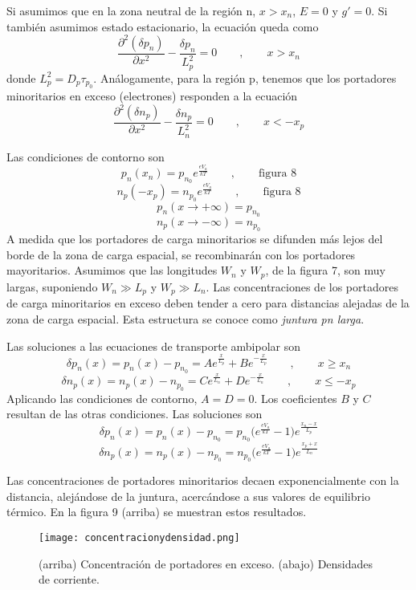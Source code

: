 \documentclass[12pt,a4paper]{article}
\begin{document}
Si asumimos que en la zona neutral de la región n, $x>x_{n}$, $E=0$ y $g'=0$. Si también asumimos estado estacionario, la ecuación queda como
\[ \frac{\partial^{2} (\delta p_{n})}{\partial x^{2}} - \frac{\delta p_{n}}{L_{p}^{2}} = 0 \qquad , \qquad x>x_{n} \]
donde $L_{p}^{2}=D_{p}\tau _{p_{0}}$. Análogamente, para la región p, tenemos que los portadores minoritarios en exceso (electrones) responden a la ecuación
\[ \frac{\partial^{2} (\delta n_{p})}{\partial x^{2}} - \frac{\delta n_{p}}{L_{n}^{2}} = 0 \qquad , \qquad x<-x_{p} \]

Las condiciones de contorno son
\[ p_{n}(x_{n})=p_{n_{0}} e^{\frac{eV_{a}}{kT}} \qquad , \qquad \textrm{figura 8} \]
\[ n_{p}(-x_{p})=n_{p_{0}} e^{\frac{eV_{a}}{kT}} \qquad , \qquad \textrm{figura 8} \]
\[ p_{n}(x \rightarrow +\infty)=p_{n_{0}} \]
\[ n_{p}(x \rightarrow -\infty)=n_{p_{0}} \]
A medida que los portadores de carga minoritarios se difunden más lejos del borde de la zona de carga espacial, se recombinarán con los portadores mayoritarios. Asumimos que las longitudes $W_{n}$ y $W_{p}$, de la figura 7, son muy largas, suponiendo $W_{n} \gg L_{p}$ y $W_{p} \gg L_{n}$. Las concentraciones de los portadores de carga minoritarios en exceso deben tender a cero para distancias alejadas de la zona de carga espacial. Esta estructura se conoce como \emph{juntura pn larga}.

Las soluciones a las ecuaciones de transporte ambipolar son
\[ \delta p_{n}(x)=p_{n}(x)-p_{n_{0}}= Ae^{\frac{x}{L_{p}}}+Be^{-\frac{x}{L_{p}}} \qquad , \qquad x \geq x_{n} \]
\[ \delta n_{p}(x)=n_{p}(x)-n_{p_{0}}= Ce^{\frac{x}{L_{n}}}+De^{-\frac{x}{L_{n}}} \qquad , \qquad x \leq -x_{p} \]
Aplicando las condiciones de contorno, $A=D=0$. Los coeficientes $B$ y $C$ resultan de las otras condiciones. Las soluciones son
\[ \delta p_{n}(x)=p_{n}(x)-p_{n_{0}}=p_{n_{0}} \big( e^{\frac{eV_{a}}{kT}} -1 \big) e^{\frac{x_{n}-x}{L_{p}}} \]
\[ \delta n_{p}(x)=n_{p}(x)-n_{p_{0}}=n_{p_{0}} \big( e^{\frac{eV_{a}}{kT}} -1 \big) e^{\frac{x_{p}+x}{L_{n}}} \]

Las concentraciones de portadores minoritarios decaen exponencialmente con la distancia, alejándose de la juntura, acercándose a sus valores de equilibrio térmico. En la figura 9 (arriba) se muestran estos resultados.

\begin{figure}[ht!]
\begin{center}
\texttt{[image: concentracionydensidad.png]}
\caption{(arriba) Concentración de portadores en exceso. (abajo) Densidades de corriente.}
\end{center}
\end{figure}
\end{document}
